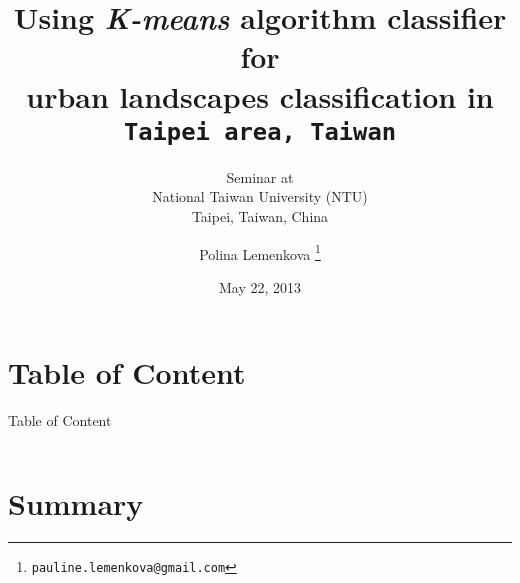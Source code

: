 \documentclass[pdflatex,compress,8pt,
	xcolor={dvipsnames,dvipsnames,svgnames,x11names,table},
	hyperref={	
	breaklinks = true, 
	pdfauthor={Lemenkova Polina}, 
	pdfsubject={Preentation}, 
	pdfcreator={Lemenkova Polina}, 
	pdfproducer={Lemenkova Polina}, 
	colorlinks=true,
	linkcolor=Gold1, 
	citecolor=NavyBlue, 
	urlcolor = NavyBlue, 
	breaklinks = true}]{beamer}
\title[Using K-means algorithm classifier for urban landscapes classification in Taipei. 22/05/2013]{Using \emph{K-means} algorithm classifier for \\
urban landscapes classification in \\
\texttt{Taipei area, Taiwan}}
\subtitle{Seminar at \\
National Taiwan University (NTU)\\
Taipei, Taiwan, China}
\author[Polina Lemenkova]{Polina Lemenkova \footnote{\texttt{pauline.lemenkova@gmail.com}}}
\date{May 22, 2013}
\begin{document}
\begin{frame}
  \maketitle
\end{frame}

\section*{Table of Content}
\begin{frame}{Table of Content}
    \begin{columns}[onlytextwidth,T]
        \begin{column}{.5\textwidth}
            \tiny{\tableofcontents[sections=1-11]}
        \end{column}
        \begin{column}{.5\textwidth}
            \tiny{\tableofcontents[sections=12-20]}
        \end{column}
    \end{columns}
\end{frame}


\section{Summary}
\end{document}
